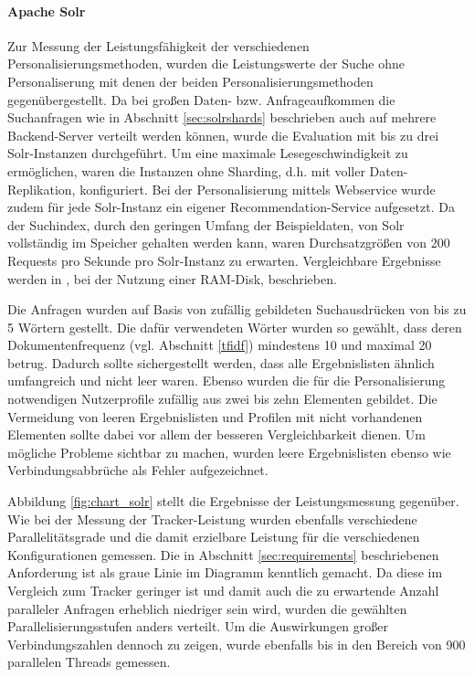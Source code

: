 \paragraph{Apache Solr} Zur Messung der Leistungsfähigkeit der verschiedenen Personalisierungsmethoden, wurden die Leistungswerte der Suche ohne Personaliserung mit denen der beiden Personalisierungsmethoden gegenübergestellt. Da bei großen Daten- bzw. Anfrageaufkommen die Suchanfragen wie in Abschnitt  \ref{sec:solrshards} beschrieben auch auf mehrere Backend-Server verteilt werden können, wurde die Evaluation mit bis zu drei Solr-Instanzen durchgeführt. Um eine maximale Lesegeschwindigkeit zu ermöglichen, waren die Instanzen ohne Sharding, d.h. mit voller Daten-Replikation, konfiguriert. Bei der Personalisierung mittels Webservice wurde zudem für jede Solr-Instanz ein eigener Recommendation-Service aufgesetzt. Da der Suchindex, durch den geringen Umfang der Beispieldaten, von Solr vollständig im Speicher gehalten werden kann, waren Durchsatzgrößen von 200 Requests pro Sekunde pro Solr-Instanz zu erwarten. Vergleichbare Ergebnisse werden in \citep{Rappold2013}, bei der Nutzung einer RAM-Disk, beschrieben.

Die Anfragen wurden auf Basis von zufällig gebildeten Suchausdrücken von bis zu 5 Wörtern gestellt. Die dafür verwendeten Wörter wurden so gewählt, dass deren Dokumentenfrequenz (vgl. Abschnitt \ref{tfidf}) mindestens 10 und maximal 20 betrug. Dadurch sollte sichergestellt werden, dass alle Ergebnislisten ähnlich umfangreich und nicht leer waren. Ebenso wurden die für die Personalisierung notwendigen Nutzerprofile zufällig aus zwei bis zehn Elementen gebildet. Die Vermeidung von leeren Ergebnislisten und Profilen mit nicht vorhandenen Elementen sollte dabei vor allem der besseren Vergleichbarkeit dienen.  Um mögliche Probleme sichtbar zu machen, wurden leere Ergebnislisten ebenso wie Verbindungsabbrüche als Fehler aufgezeichnet.

Abbildung \ref{fig:chart_solr} stellt die Ergebnisse der Leistungsmessung gegenüber. Wie bei der Messung der Tracker-Leistung wurden ebenfalls verschiedene Parallelitätsgrade und die damit erzielbare Leistung für die verschiedenen Konfigurationen gemessen. Die in Abschnitt \ref{sec:requirements} beschriebenen Anforderung ist als graue Linie im Diagramm kenntlich gemacht. Da diese im Vergleich zum Tracker geringer ist und damit auch die zu erwartende Anzahl paralleler Anfragen erheblich niedriger sein wird, wurden die gewählten Parallelisierungsstufen anders verteilt. Um die Auswirkungen großer Verbindungszahlen dennoch zu zeigen, wurde ebenfalls bis in den Bereich von 900 parallelen Threads gemessen.

